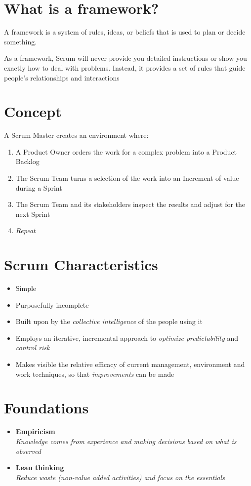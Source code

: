 \documentclass[a4paper,11pt,twocolumn]{article}
\begin{document}
\section*{What is a framework?}
A framework is a system of rules, ideas, or beliefs that is used to plan or decide something.

\begin{tcolorbox}[colback=black!8!white,colframe=gray!50!black,title=Note,sharp corners,fonttitle=\normalsize\bfseries,fontupper=\normalsize,left=0.7em,right=0.7em]
	As a framework, Scrum will never provide you detailed instructions or show you exactly how to deal with problems. Instead, it provides a set of rules that guide people's relationships and interactions
\end{tcolorbox}

\section*{Concept}
A Scrum Master creates an environment where:
\begin{enumerate}
	\item A Product Owner orders the work for a complex problem into a Product Backlog
	\item The Scrum Team turns a selection of the work into an Increment of value during a Sprint
	\item The Scrum Team and its stakeholders inspect the results and adjust for the next Sprint
	\item \textit{Repeat}
\end{enumerate}

\section*{Scrum Characteristics}
\begin{itemize}
	\item Simple
	\item Purposefully incomplete
	\item Built upon by the \textit{collective intelligence} of the people using it
	\item Employs an iterative, incremental approach to \textit{optimize predictability} and \textit{control risk}
	\item Makes visible the relative efficacy of current management, environment and work techniques, so that \textit{improvements} can be made
\end{itemize}

\section*{Foundations}
\begin{itemize}
	\item \textbf{Empiricism}\\
	\textit{Knowledge comes from experience and making decisions based on what is observed}
	\item \textbf{Lean thinking}\\
	\textit{Reduce waste (non-value added activities) and focus on the essentials}
\end{itemize}
\end{document}
